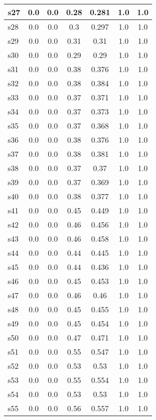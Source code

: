 \documentclass{article}
\begin{document}
\begin{tabular}{|l|c|c|c|c|c|c|}
\hline
s27 &0.0 & 0.0 & 0.28 & 0.281 & 1.0 & 1.0\\
\hline
s28 &0.0 & 0.0 & 0.3 & 0.297 & 1.0 & 1.0\\
\hline
s29 &0.0 & 0.0 & 0.31 & 0.31 & 1.0 & 1.0\\
\hline
s30 &0.0 & 0.0 & 0.29 & 0.29 & 1.0 & 1.0\\
\hline
s31 &0.0 & 0.0 & 0.38 & 0.376 & 1.0 & 1.0\\
\hline
s32 &0.0 & 0.0 & 0.38 & 0.384 & 1.0 & 1.0\\
\hline
s33 &0.0 & 0.0 & 0.37 & 0.371 & 1.0 & 1.0\\
\hline
s34 &0.0 & 0.0 & 0.37 & 0.373 & 1.0 & 1.0\\
\hline
s35 &0.0 & 0.0 & 0.37 & 0.368 & 1.0 & 1.0\\
\hline
s36 &0.0 & 0.0 & 0.38 & 0.376 & 1.0 & 1.0\\
\hline
s37 &0.0 & 0.0 & 0.38 & 0.381 & 1.0 & 1.0\\
\hline
s38 &0.0 & 0.0 & 0.37 & 0.37 & 1.0 & 1.0\\
\hline
s39 &0.0 & 0.0 & 0.37 & 0.369 & 1.0 & 1.0\\
\hline
s40 &0.0 & 0.0 & 0.38 & 0.377 & 1.0 & 1.0\\
\hline
s41 &0.0 & 0.0 & 0.45 & 0.449 & 1.0 & 1.0\\
\hline
s42 &0.0 & 0.0 & 0.46 & 0.456 & 1.0 & 1.0\\
\hline
s43 &0.0 & 0.0 & 0.46 & 0.458 & 1.0 & 1.0\\
\hline
s44 &0.0 & 0.0 & 0.44 & 0.445 & 1.0 & 1.0\\
\hline
s45 &0.0 & 0.0 & 0.44 & 0.436 & 1.0 & 1.0\\
\hline
s46 &0.0 & 0.0 & 0.45 & 0.453 & 1.0 & 1.0\\
\hline
s47 &0.0 & 0.0 & 0.46 & 0.46 & 1.0 & 1.0\\
\hline
s48 &0.0 & 0.0 & 0.45 & 0.455 & 1.0 & 1.0\\
\hline
s49 &0.0 & 0.0 & 0.45 & 0.454 & 1.0 & 1.0\\
\hline
s50 &0.0 & 0.0 & 0.47 & 0.471 & 1.0 & 1.0\\
\hline
s51 &0.0 & 0.0 & 0.55 & 0.547 & 1.0 & 1.0\\
\hline
s52 &0.0 & 0.0 & 0.53 & 0.53 & 1.0 & 1.0\\
\hline
s53 &0.0 & 0.0 & 0.55 & 0.554 & 1.0 & 1.0\\
\hline
s54 &0.0 & 0.0 & 0.53 & 0.53 & 1.0 & 1.0\\
\hline
s55 &0.0 & 0.0 & 0.56 & 0.557 & 1.0 & 1.0\\

\end{tabular}
\end{document}
